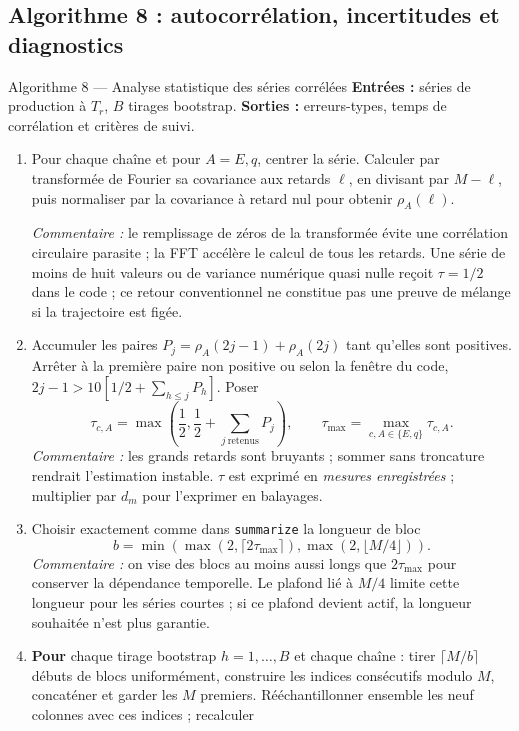 \documentclass[10pt,a4paper]{article}
\begin{document}
\subsection{Algorithme 8 : autocorrélation, incertitudes et diagnostics}
\begin{algocode}{Algorithme 8 --- Analyse statistique des séries corrélées}
\textbf{Entrées :} séries de production à $T_r$, $B$ tirages bootstrap.
\textbf{Sorties :} erreurs-types, temps de corrélation et critères de suivi.
\begin{enumerate}
\item Pour chaque chaîne et pour $A=E,q$, centrer la série. Calculer par
transformée de Fourier sa covariance aux retards $\ell$, en divisant par
$M-\ell$, puis normaliser par la covariance à retard nul pour obtenir
$\rho_A(\ell)$.
\par\textit{Commentaire :} le remplissage de zéros de la transformée évite
une corrélation circulaire parasite ; la FFT accélère le calcul de tous les
retards. Une série de moins de huit valeurs ou de variance numérique
quasi nulle reçoit $\tau=1/2$ dans le code ; ce retour conventionnel ne
constitue pas une preuve de mélange si la trajectoire est figée.
\item Accumuler les paires
$P_j=\rho_A(2j-1)+\rho_A(2j)$ tant qu'elles sont positives. Arrêter à la
première paire non positive ou selon la fenêtre du code,
$2j-1>10[1/2+\sum_{h\le j}P_h]$. Poser
\[
\tau_{c,A}=\max\left(\frac12,\frac12+\sum_{j\ \text{retenus}}P_j\right),
\qquad \tau_{\max}=\max_{c,A\in\{E,q\}}\tau_{c,A}.
\]
\textit{Commentaire :} les grands retards sont bruyants ; sommer sans
troncature rendrait l'estimation instable. $\tau$ est exprimé en
\emph{mesures enregistrées} ; multiplier par $d_m$ pour l'exprimer en balayages.
\item Choisir exactement comme dans \texttt{summarize} la longueur de bloc
\[
b=\min\!\left(\max(2,\lceil2\tau_{\max}\rceil),
                \max(2,\lfloor M/4\rfloor)\right).
\]
\textit{Commentaire :} on vise des blocs au moins aussi longs que
$2\tau_{\max}$ pour conserver la dépendance temporelle. Le plafond lié à
$M/4$ limite cette longueur pour les séries courtes ; si ce plafond devient
actif, la longueur souhaitée n'est plus garantie.
\item \textbf{Pour} chaque tirage bootstrap $h=1,\ldots,B$ et chaque chaîne :
tirer $\lceil M/b\rceil$ débuts de blocs uniformément, construire les
indices consécutifs modulo $M$, concaténer et garder les $M$ premiers.
Rééchantillonner ensemble les neuf colonnes avec ces indices ; recalculer

\end{enumerate}
\end{algocode}
\end{document}
